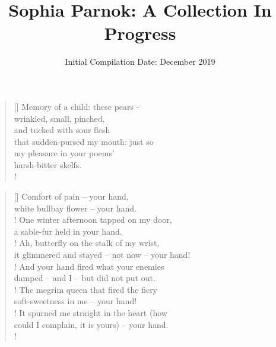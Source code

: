 \documentclass[]{article}
\title{Sophia Parnok: A Collection In Progress}
\date{Initial Compilation Date: December 2019}
\begin{document}
\maketitle
\newpage

\tableofcontents
\newpage


\settowidth{\versewidth}{that sudden-pursed my mouth }
\begin{verse}[\versewidth]
Memory of a child: these pears - \\
wrinkled, small, pinched, \\
and tucked with sour flesh \\
that sudden-pursed my mouth: just so \\
my pleasure in your poems' \\
harsh-bitter skelfs.\\!
\end{verse}
\bigskip \bigskip 

\settowidth{\versewidth}{white bullbay flower -- your hand}
\begin{verse}[\versewidth]
Comfort of pain -- your hand,\\
white bullbay flower -- your hand.\\!
One winter afternoon tapped on my door,\\
a sable-fur held in your hand.\\!
Ah, butterfly on the stalk of my wrist,\\
it glimmered and stayed -- not now -- your hand!\\!
And your hand fired what your enemies\\
damped -- and I -- but did not put out.\\!
The megrim queen that fired the fiery\\ soft-sweetness in me -- your hand!\\!
It spurned me straight in the heart (how\\
could I complain, it is yours) -- your hand.\\!
\end{verse}
\bigskip \bigskip
\end{document}
